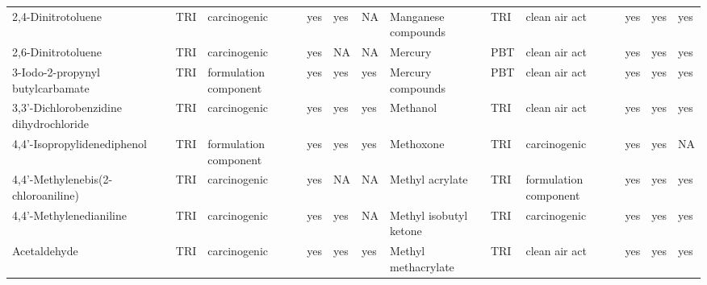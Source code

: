 \begin{table}[H]
{\begin{tabular}{llllllllllll}
            2,4-Dinitrotoluene                                                         & TRI            & carcinogenic          & yes    & yes     & NA   & Manganese compounds                                                                                                & TRI            & clean air act & yes & yes & yes\\
            2,6-Dinitrotoluene                                                         & TRI            & carcinogenic          & yes    & NA      & NA   & Mercury                                                                                                            & PBT            & clean air act         & yes    & yes     & yes  \\
            3-Iodo-2-propynyl butylcarbamate                                           & TRI            & formulation component & yes    & yes     & yes  & Mercury compounds & PBT & clean air act & yes & yes & yes\\
            3,3'-Dichlorobenzidine dihydrochloride                                     & TRI            & carcinogenic          & yes    & yes     & yes  & Methanol                                                                                                           & TRI & clean air act & yes & yes & yes\\
            4,4'-Isopropylidenediphenol                                                & TRI            & formulation component & yes    & yes     & yes  & Methoxone                                                                                                          & TRI            & carcinogenic & yes & yes & NA\\
            4,4'-Methylenebis(2-chloroaniline)                                         & TRI            & carcinogenic          & yes    & NA      & NA   & Methyl acrylate                                                                                                    & TRI & formulation component & yes & yes & yes\\
            4,4'-Methylenedianiline                                                    & TRI            & carcinogenic          & yes    & yes     & NA   & Methyl isobutyl ketone                                                                                             & TRI            & carcinogenic & yes & yes & yes\\
            Acetaldehyde                                                               & TRI            & carcinogenic          & yes    & yes     & yes  & Methyl methacrylate                                                                                                & TRI            & clean air act         & yes & yes & yes\\

\end{tabular}}
\end{table}
